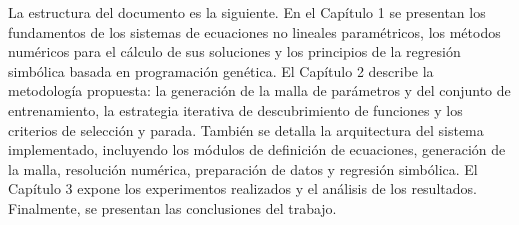 \begin{introduction}
La estructura del documento es la siguiente. En el Capítulo 1 se presentan los fundamentos de los sistemas de ecuaciones no lineales paramétricos, los métodos numéricos para el cálculo de sus soluciones y los principios de la regresión simbólica basada en programación genética. El Capítulo 2 describe la metodología propuesta: la generación de la malla de parámetros y del conjunto de entrenamiento, la estrategia iterativa de descubrimiento de funciones y los criterios de selección y parada. También se detalla la arquitectura del sistema implementado, incluyendo los módulos de definición de ecuaciones, generación de la malla, resolución numérica, preparación de datos y regresión simbólica. El Capítulo 3 expone los experimentos realizados y el análisis de los resultados. Finalmente, se presentan las conclusiones del trabajo.
\end{introduction}
